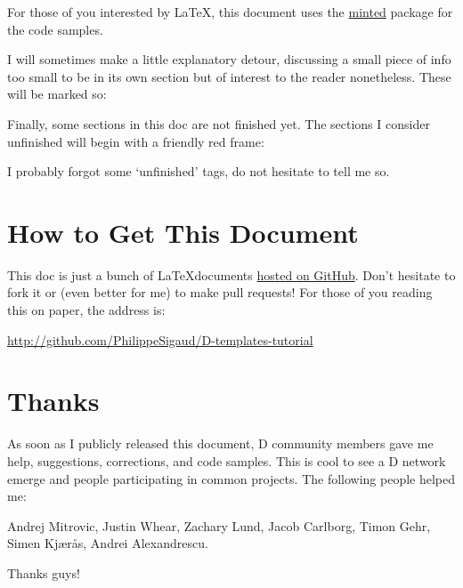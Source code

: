 For those of you interested by \LaTeX, this document uses the \href{http://code.google.com/p/minted/}{minted} package for the code samples. 

I will sometimes make a little explanatory detour, discussing a small piece of info too small to be in its own section but of interest to the reader nonetheless. These will be marked so:


Finally, some sections in this doc are not finished yet. The sections I consider unfinished will begin with a friendly red frame:


I probably forgot some `unfinished' tags, do not hesitate to tell me so.

\section*{How to Get This Document}\label{howtoget}

This doc is just a bunch of \LaTeX documents \href{http://github.com/PhilippeSigaud/D-templates-tutorial}{hosted on GitHub}. Don't hesitate to fork it or (even better for me) to make pull requests! For those of you reading this on paper, the address is:

\vspace{8pt}
\url{http://github.com/PhilippeSigaud/D-templates-tutorial}

\section*{Thanks}\label{thanks}

As soon as I publicly released this document, D community members gave me help, suggestions, corrections, and code samples. This is cool to see a D network emerge and people participating in common projects. The following people helped me:

Andrej Mitrovic, Justin Whear, Zachary Lund, Jacob Carlborg, Timon Gehr, Simen Kj\ae r\r{a}s, Andrei Alexandrescu.

\vspace{8pt}
Thanks guys! 
